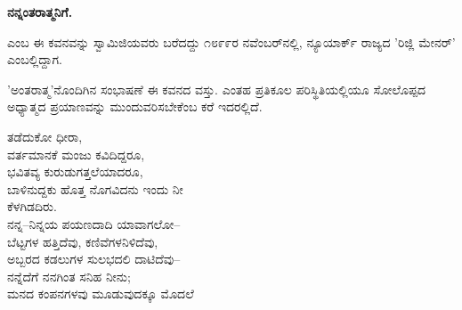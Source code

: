 \begin{myquote}
\end{myquote}

\begin{myquote}
\end{myquote}

\begin{myquote}
\end{myquote}

\begin{center}
\textbf{ನನ್ನಂತರಾತ್ಮನಿಗೆ.}
\end{center}

 ಎಂಬ ಈ ಕವನವನ್ನು ಸ್ವಾಮಿಜಿಯವರು ಬರೆದದ್ದು ೧೮೯೯ರ ನವೆಂಬರ್‌ನಲ್ಲಿ, ನ್ಯೂಯಾರ್ಕ್ ರಾಜ್ಯದ 'ರಿಜ್ಲಿ ಮೇನರ್' ಎಂಬಲ್ಲಿದ್ದಾಗ.

'ಅಂತರಾತ್ಮ'ನೊಂದಿಗಿನ ಸಂಭಾಷಣೆ ಈ ಕವನದ ವಸ್ತು. ಎಂತಹ ಪ್ರತಿಕೂಲ ಪರಿಸ್ಥಿತಿಯಲ್ಲಿಯೂ ಸೋಲೊಪ್ಪದ ಅಧ್ಯಾತ್ಮದ ಪ್ರಯಾಣವನ್ನು ಮುಂದುವರಿಸಬೇಕೆಂಬ ಕರೆ ಇದರಲ್ಲಿದೆ.

\begin{myquote}
ತಡೆದುಕೋ ಧೀರಾ,\\ವರ್ತಮಾನಕೆ ಮಂಜು ಕವಿದಿದ್ದರೂ,\\ಭವಿತವ್ಯ ಕುರುಡುಗತ್ತಲೆಯಾದರೂ,\\ಬಾಳಿನುದ್ದಕು ಹೊತ್ತ ನೊಗವಿದನು ಇಂದು ನೀ\\ಕೆಳಗಿಡದಿರು.\\ನನ್ನ–ನಿನ್ನಯ ಪಯಣದಾದಿ ಯಾವಾಗಲೋ–\\ಬೆಟ್ಟಗಳ ಹತ್ತಿದೆವು, ಕಣಿವೆಗಳನಿಳಿದೆವು,\\ಅಬ್ಬರದ ಕಡಲುಗಳ ಸುಲಭದಲಿ ದಾಟಿದೆವು–\\ನನ್ನೆದೆಗೆ ನನಗಿಂತ ಸನಿಹ ನೀನು;\\ಮನದ ಕಂಪನಗಳವು ಮೂಡುವುದಕ್ಕೂ ಮೊದಲೆ
\end{myquote}


